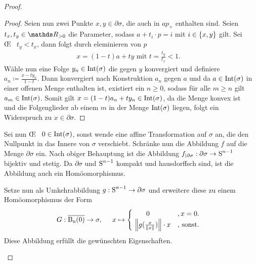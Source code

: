 \begin{Satz}
\begin{proof}
\begin{enumerate}[(a):]
\begin{Beh}
\begin{proof}
          Seien nun zwei Punkte $x,y \in \partial\sigma$, die auch in
          $ap_+$ enthalten sind. Seien $t_x, t_y \in \R_{> 0}$ die
          Parameter, sodass $a + t_i \cdot p = i$ mit
          $i \in \sset{x,y}$ gilt. Sei \OE~ $t_y < t_x$, dann folgt
          durch eleminieren von $p$
          \begin{gather*}
            x = (1-t) a + ty \text{ mit } t=\frac{t_y}{t_x} < 1.
          \end{gather*}
          Wähle nun eine Folge $y_n \in \Int(\sigma)$ die gegen $y$
          konvergiert und definiere
          $a_n \coloneqq \frac{x -ty_n}{1-t}$.  Dann konvergiert nach
          Konstruktion $a_n$ gegen $a$ und da $a \in \Int(\sigma)$ in
          einer offenen Menge enthalten ist, existiert ein $n \geq 0$,
          sodass für alle $m \geq n$ gilt $a_m \in
          \Int(\sigma)$.
          Somit gilt $x = (1-t) a_n + ty_n \in \Int(\sigma)$, da die
          Menge konvex ist und die Folgenglieder ab einem $m$ in der
          Menge $\Int(\sigma)$ liegen, folgt ein Widerspruch zu
          $x \in \partial\sigma$.
        \end{proof}
      \end{Beh}
      Sei nun \OE~ $0 \in \Int(\sigma)$, sonst wende eine affine
      Transformation auf $\sigma$ an, die den Nullpunkt in das Innere
      von $\sigma$ verschiebt.  
      Schränke nun die Abbildung $f$ auf die
      Menge $\partial\sigma$ ein. Nach obiger Behauptung ist die
      Abbildung
      $f_{| \partial\sigma} : \partial\sigma \rightarrow \Sp^{n-1}$
      bijektiv und stetig. Da $\partial\sigma$ und $\Sp^{n-1}$ kompakt und
      hausdorffsch sind, ist die Abbildung auch ein Homöomorphismus.
      
      Setze nun als Umkehrabbildung $g : \Sp^{n-1} \rightarrow \partial\sigma$ 
      und erweitere diese zu einem Homöomorphismus der Form
      \begin{gather*}
        G : \Bn \rightarrow \sigma , \hspace{0.5cm}
        x \mapsto 
        \begin{cases}
          \hspace{.7cm}0 & , x = 0. \\
          ~\nn[g(\frac{x}{\nn[x]})] \cdot x & \text{, sonst}.
        \end{cases}
      \end{gather*}
      Diese Abbildung erfüllt die gewünschten Eigenschaften.
    \end{enumerate}
  \end{proof}
\end{Satz}


